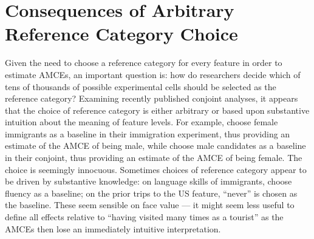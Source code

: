 \documentclass[a4paper,12pt]{article}\usepackage[]{graphicx}\usepackage[]{color}
\begin{document}


\section*{Consequences of Arbitrary Reference Category Choice}\label{sec:challenges}

Given the need to choose a reference category for every feature in order to estimate AMCEs, an important question is: how do researchers decide which of tens of thousands of possible experimental cells should be selected as the reference category? Examining recently published conjoint analyses, it appears that the choice of reference category is either arbitrary or based upon substantive intuition about the meaning of feature levels. For example, \citet{HainmuellerHopkinsYamamoto2014} choose female immigrants as a baseline in their immigration experiment, thus providing an estimate of the AMCE of being male, while \citet{TeeleKallaRosenbluth2018} choose male candidates as a baseline in their conjoint, thus providing an estimate of the AMCE of being female. The choice is seemingly innocuous. Sometimes choices of reference category appear to be driven by substantive knowledge: on language skills of immigrants, \citet{HainmuellerHopkinsYamamoto2014} choose fluency as a baseline; on the prior trips to the US feature, ``never'' is chosen as the baseline. These seem sensible on face value --- it might seem less useful to define all effects relative to ``having visited many times as a tourist'' as the AMCEs then lose an immediately intuitive interpretation.
\end{document}
